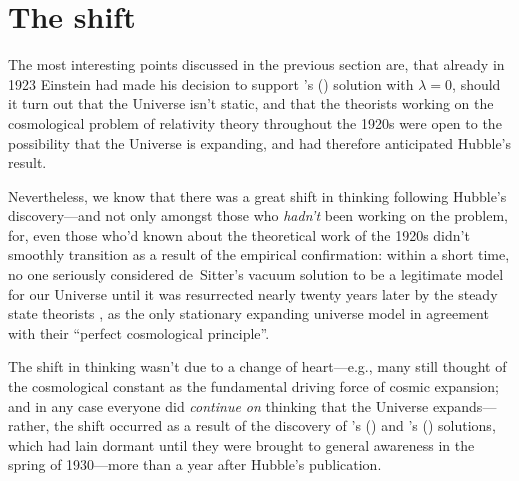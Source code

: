 \documentclass[12 pt]{article}
\def\citeapos#1{\citeauthor{#1}'s (\citeyear{#1})}
\begin{document}
\section{The shift}
\label{sec:4}
The most interesting points discussed in the previous section are, that already in 1923 Einstein had made his decision to support \citeapos{Friedmann1922} solution with $\lambda=0$, should it turn out that the Universe isn't static, and that the theorists working on the cosmological problem of relativity theory throughout the 1920s were open to the possibility that the Universe is expanding, and had therefore anticipated Hubble's result. 

Nevertheless, we know that there was a great shift in thinking following Hubble's discovery---and not only amongst those who \textit{hadn't} been working on the problem, for, even those who'd known about the theoretical work of the 1920s didn't smoothly transition as a result of the empirical confirmation: within a short time, no one seriously considered de~Sitter's vacuum solution to be a legitimate model for our Universe until it was resurrected nearly twenty years later by the steady state theorists \citep{Hoyle1948,Bondi1948}, as the only stationary expanding universe model in agreement with their ``perfect cosmological principle''.

The shift in thinking wasn't due to a change of heart---e.g., many still thought of the cosmological constant as the fundamental driving force of cosmic expansion; and in any case everyone did \textit{continue on} thinking that the Universe expands---rather, the shift occurred as a result of the discovery of \citeapos{Friedmann1922} and \citeapos{Lemaitre1927} solutions, which had lain dormant until they were brought to general awareness in the spring of 1930---more than a year after Hubble's publication.
\end{document}
